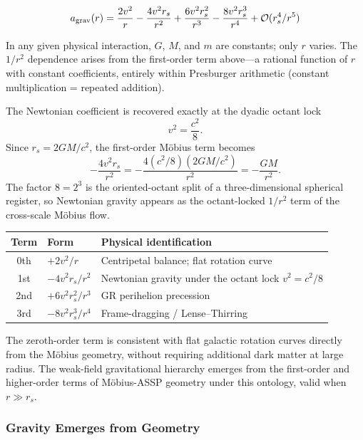 \documentclass[11pt,a4paper]{article}
\begin{document}
      \begin{equation}
      a_{\rm grav}(r) = \frac{2v^2}{r}
        - \frac{4v^2 r_s}{r^2}
        + \frac{6v^2 r_s^2}{r^3}
        - \frac{8v^2 r_s^3}{r^4}
        + \mathcal{O}(r_s^4/r^5)
      \label{eq:laurent}
      \end{equation}

      In any given physical interaction, $G$, $M$, and $m$ are constants; only $r$ varies. The $1/r^2$ dependence arises from the first-order term above---a rational function of $r$ with constant coefficients, entirely within Presburger arithmetic (constant multiplication = repeated addition).

      The Newtonian coefficient is recovered exactly at the dyadic octant lock
      \[
      v^2=\frac{c^2}{8}.
      \]
      Since \(r_s=2GM/c^2\), the first-order Möbius term becomes
      \[
      -\frac{4v^2r_s}{r^2}
      =
      -\frac{4(c^2/8)(2GM/c^2)}{r^2}
      =
      -\frac{GM}{r^2}.
      \]
      The factor \(8=2^3\) is the oriented-octant split of a three-dimensional spherical register, so Newtonian gravity appears as the octant-locked \(1/r^2\) term of the cross-scale Möbius flow.

      \begin{table}[h]
      \centering
      \begin{tabular}{|c|l|l|}
      \hline
      \textbf{Term} & \textbf{Form} & \textbf{Physical identification} \\
      \hline
      0th & $+2v^2/r$          & Centripetal balance; flat rotation curve \\
      1st & $-4v^2 r_s/r^2$    & Newtonian gravity under the octant lock $v^2=c^2/8$ \\
      2nd & $+6v^2 r_s^2/r^3$  & GR perihelion precession \\
      3rd & $-8v^2 r_s^3/r^4$  & Frame-dragging / Lense--Thirring \\
      \hline
      \end{tabular}
      \end{table}

      The zeroth-order term is consistent with flat galactic rotation curves directly from the Möbius geometry, without requiring additional dark matter at large radius. The weak-field gravitational hierarchy emerges from the first-order and higher-order terms of Möbius-ASSP geometry under this ontology, valid when $r \gg r_s$.

    \subsubsection{Gravity Emerges from Geometry}
\end{document}
